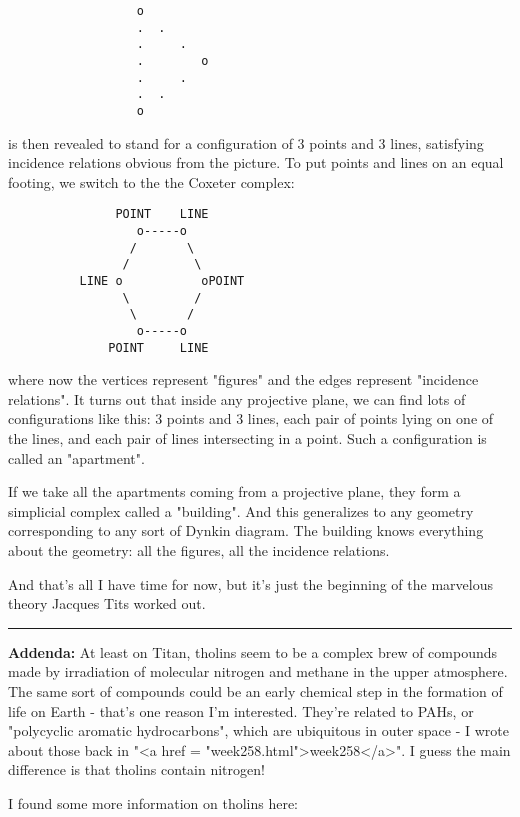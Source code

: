 \begin{verbatim}
                  o
                  .  .   
                  .     . 
                  .        o
                  .     .  
                  .  .
                  o
\end{verbatim}
    
is then revealed to stand for a configuration of 3 points and 3 
lines, satisfying incidence relations obvious from the picture.  
To put points and lines on an equal footing, we switch to the  
the Coxeter complex:

\begin{verbatim}
               POINT    LINE      
                  o-----o
                 /       \
                /         \
          LINE o           oPOINT
                \         / 
                 \       /
                  o-----o
              POINT     LINE
\end{verbatim}
    
where now the vertices represent "figures" and the edges represent
"incidence relations".  It turns out that inside any projective
plane, we can find lots of configurations like this: 3 points and
3 lines, each pair of points lying on one of the lines, and each 
pair of lines intersecting in a point.  Such a configuration is
called an "apartment".  

If we take all the apartments coming from a projective plane, they
form a simplicial complex called a "building".  And this generalizes
to any geometry corresponding to any sort of Dynkin diagram.  The
building knows everything about the geometry: all the figures, all
the incidence relations.


And that's all I have time for now, but it's just the beginning of
the marvelous theory Jacques Tits worked out.

\par\noindent\rule{\textwidth}{0.4pt}
\textbf{Addenda:} At least on Titan, tholins seem to be a complex 
brew of compounds made by irradiation of molecular nitrogen and 
methane in the upper atmosphere.  The same sort of compounds 
could be an early chemical step in the formation of life on Earth - 
that's one reason I'm interested.  They're related to PAHs, or
"polycyclic aromatic hydrocarbons", which are ubiquitous
in outer space - I wrote about those back in "<a href = 
"week258.html">week258</a>".  I guess the main difference
is that tholins contain nitrogen!

I found some more information on tholins here:

